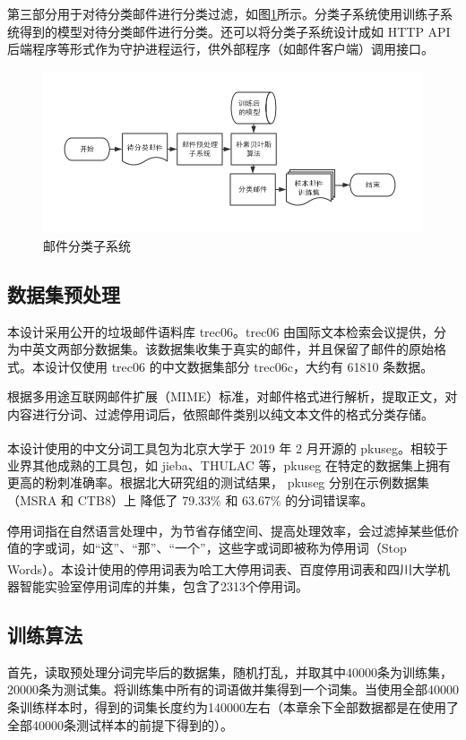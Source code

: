 \documentclass[UTF8,zihao=-4]{ctexart}
\newcommand{\upcite}[1]{\textsuperscript{\cite{#1}}}
\begin{document}
	第三部分用于对待分类邮件进行分类过滤，如图\ref{fig:predict-system}所示。分类子系统使用训练子系统得到的模型对待分类邮件进行分类。还可以将分类子系统设计成如 HTTP API 后端程序等形式作为守护进程运行，供外部程序（如邮件客户端）调用接口。
	\begin{figure}[H]
		\centering
		\setlength{\abovecaptionskip}{0.cm}
		\setlength{\belowcaptionskip}{-0.cm}	
		\includegraphics[scale=0.45]{pictures/邮件分类子系统.png}
		\caption{邮件分类子系统}
		\label{fig:predict-system}
	\end{figure}


\subsection{数据集预处理}
	本设计采用公开的垃圾邮件语料库  trec06。trec06 由国际文本检索会议提供，分为中英文两部分数据集。该数据集收集于真实的邮件，并且保留了邮件的原始格式。本设计仅使用 trec06 的中文数据集部分 trec06c，大约有 61810 条数据。

	根据多用途互联网邮件扩展（MIME）标准，对邮件格式进行解析，提取正文，对内容进行分词、过滤停用词后，依照邮件类别以纯文本文件的格式分类存储。
		
	本设计使用的中文分词工具包为北京大学于 2019 年 2 月开源的 pkuseg\upcite{pkuseg}。相较于业界其他成熟的工具包，如 jieba、THULAC 等，pkuseg 在特定的数据集上拥有更高的粉刺准确率。根据北大研究组的测试结果， pkuseg 分别在示例数据集（MSRA 和 CTB8）上
降低了 79.33\% 和 63.67\% 的分词错误率。
	
	停用词指在自然语言处理中，为节省存储空间、提高处理效率，会过滤掉某些低价值的字或词，如“这”、“那”、“一个”，这些字或词即被称为停用词（Stop Words）\upcite{stopwords}。本设计使用的停用词表为哈工大停用词表、百度停用词表和四川大学机器智能实验室停用词库的并集，包含了2313个停用词。
\subsection{训练算法}
	首先，读取预处理分词完毕后的数据集，随机打乱，并取其中40000条为训练集，20000条为测试集。将训练集中所有的词语做并集得到一个词集。当使用全部40000条训练样本时，得到的词集长度约为140000左右（本章余下全部数据都是在使用了全部40000条测试样本的前提下得到的）。
	
\end{document}
